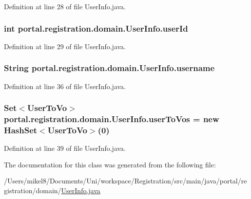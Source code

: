 Definition at line 28 of file UserInfo.java.

\hypertarget{classportal_1_1registration_1_1domain_1_1UserInfo_abbdfca0a8a809e1a28a5dd2e56874c1b}{
\subsubsection[{userId}]{\setlength{\rightskip}{0pt plus 5cm}int {\bf portal.registration.domain.UserInfo.userId}}}
\label{classportal_1_1registration_1_1domain_1_1UserInfo_abbdfca0a8a809e1a28a5dd2e56874c1b}


Definition at line 29 of file UserInfo.java.

\hypertarget{classportal_1_1registration_1_1domain_1_1UserInfo_ac3583a042c907bcce6ee84d3b2ee637d}{
\subsubsection[{username}]{\setlength{\rightskip}{0pt plus 5cm}String {\bf portal.registration.domain.UserInfo.username}}}
\label{classportal_1_1registration_1_1domain_1_1UserInfo_ac3583a042c907bcce6ee84d3b2ee637d}


Definition at line 36 of file UserInfo.java.

\hypertarget{classportal_1_1registration_1_1domain_1_1UserInfo_a334522ed169ed1e54ac676a31b0cc701}{
\subsubsection[{userToVos}]{\setlength{\rightskip}{0pt plus 5cm}Set$<${\bf UserToVo}$>$ {\bf portal.registration.domain.UserInfo.userToVos} = new HashSet$<${\bf UserToVo}$>$(0)}}
\label{classportal_1_1registration_1_1domain_1_1UserInfo_a334522ed169ed1e54ac676a31b0cc701}


Definition at line 39 of file UserInfo.java.



The documentation for this class was generated from the following file:\begin{DoxyCompactItemize}
\item 
/Users/mikel8/Documents/Uni/workspace/Registration/src/main/java/portal/registration/domain/\hyperlink{UserInfo_8java}{UserInfo.java}\end{DoxyCompactItemize}
